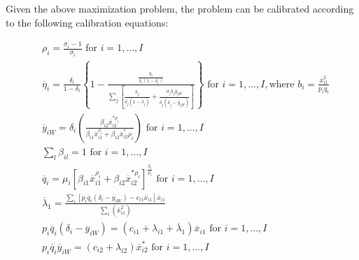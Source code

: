 \documentclass[review]{elsarticle}
\begin{document}
Given the above maximization problem, the problem can be calibrated according to the following calibration equations: 

\begin{equation}
    \begin{split}
        & \rho _ { i } = \frac { \sigma _ { i } - 1 } { \sigma _ { i } } \text { for } i = 1 , \ldots , I \\
        & \overline { \eta } _ { i } = \frac { \delta _ { i } } { 1 - \delta _ { i } } \left\{ 1 - \frac { \frac { b _ { i } } { \delta _ { i } \left( 1 - \delta _ { i } \right) } } { \sum _ { j } \left[ \frac { b _ { j } } { \delta _ { j } \left( 1 - \delta _ { j } \right) } + \frac { \sigma _ { j } b _ { j } \overline { y } _ { j W } } { \delta _ { j } \left( \delta _ { j } - \overline { y } _ { j W } \right) } \right] } \right\} \text { for } i = 1 , \ldots , I , \text {where } b _ { i } = \frac { \overline { x } _ { i 1 } ^ { 2 } } { p _ { i } \overline { q } _ { i } } \\
        & \overline { y } _ { i W } = \delta _ { i } \left( \frac { \beta _ { i 2 } \overline { x } _ { i 2 } ^ { * \rho _ { i } } } { \beta _ { i 1 } \overline { x } _ { i 1 } ^ { \rho _ { i } } + \beta _ { i 2 } \overline { x } _ { i 2 } ^ { * } \rho _ { i } } \right) \text { for } i = 1 , \ldots , I \\
        & \sum _ { l } \beta _ { i l } = 1 \text { for } i = 1 , \ldots , I \\
        & \overline { q } _ { i } = \mu _ { i } \left[ \beta _ { i 1 } \overline { x } _ { i 1 } ^ { \rho _ { i } } + \beta _ { i 2 } \overline { x } _ { i 2 } ^ { * \rho _ { i } } \right] ^ { \frac { \delta _ { i } } { \rho _ { i } } } \text { for } i = 1 , \ldots , I \\
        & \overline { \lambda } _ { 1 } = \frac { \sum _ { i } \left[ p _ { i } \overline { q } _ { i } \left( \delta _ { i } - \overline { y } _ { i W } \right) - c _ { i 1 } \overline { x } _ { i 1 } \right] \overline { x } _ { i 1 } } { \sum _ { i } \left( \overline { x } _ { i 1 } ^ { 2 } \right) } \\
        & p _ { i } \overline { q } _ { i } \left( \delta _ { i } - \overline { y } _ { i W } \right) = \left( c _ { i 1 } + \lambda _ { i 1 } + \overline { \lambda } _ { 1 } \right) \overline { x } _ { i 1 } \text { for } i = 1 , \ldots , I \\
        & p _ { i } \overline { q } _ { i } \overline { y } _ { i W } = \left( c _ { i 2 } + \lambda _ { i 2 } \right) \overline { x } _ { i 2 } ^ { * } \text { for } i = 1 , \ldots , I
    \end{split}
\end{equation}
\end{document}

